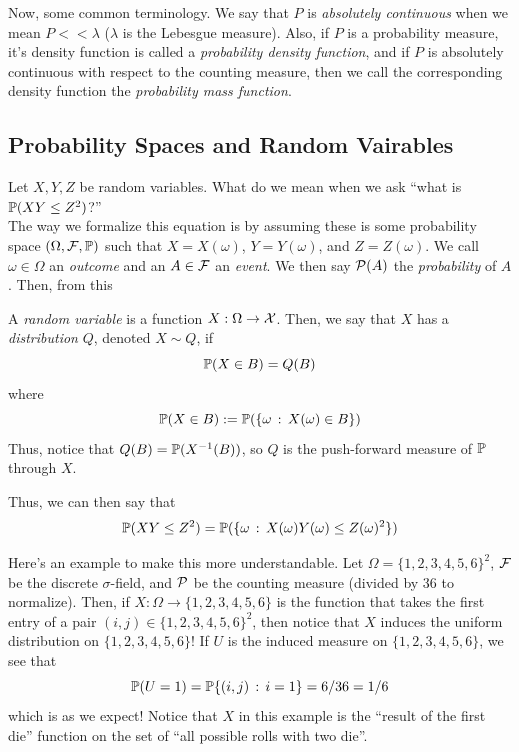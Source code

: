 Now, some common terminology. We say that $P$ is \emph{absolutely continuous} when we mean $P << \lambda$ ($\lambda$ is the Lebesgue measure). Also, if $P$ is a probability measure, it's density function is called a \emph{probability density function}, and if $P$ is absolutely continuous with respect to the counting measure, then we call the corresponding density function the \emph{probability mass function}.
\clearpage

\subsection*{Probability Spaces and Random Vairables}
Let $X, Y, Z$ be random variables. What do we mean when we ask ``what is $\bb{P}(XY \leq Z^2)$?''\\

The way we formalize this equation is by assuming these is some probability space $(\Omega, \cal{F}, \bb{P})$ such that $X = X(\omega)$, $Y = Y(\omega)$, and $Z = Z(\omega)$. We call $\omega \in \Omega$ an \emph{outcome} and an $A \in \cal{F}$ an \emph{event}. We then say $\cal{P}(A)$ the \emph{probability} of $A$. Then, from this
\begin{definition}
    A \emph{random variable} is a function $X : \Omega \to \cal{X}$. Then, we say that $X$ has a \emph{distribution} $Q$, denoted $X \sim Q$, if
    \[ \bb{P}(X \in B) = Q(B) \]
    where 
    \[ \bb{P}(X \in B) := \bb{P}(\{\omega \col X(\omega) \in B\}) \]
    Thus, notice that $Q(B) = \bb{P}(X^{-1}(B))$, so $Q$ is the push-forward measure of $\bb{P}$ through $X$.
\end{definition}

Thus, we can then say that
\[ \bb{P}(XY \leq Z^2) = \bb{P}(\{\omega \col X(\omega)Y(\omega) \leq Z(\omega)^2\}) \]

Here's an example to make this more understandable. Let $\Omega = \{1, 2, 3, 4, 5, 6\}^2$, $\cal{F}$ be the discrete $\sigma$-field, and $\cal{P}$ be the counting measure (divided by 36 to normalize). Then, if $X : \Omega \to \{1, 2, 3, 4, 5, 6\}$ is the function that takes the first entry of a pair $(i, j) \in \{1, 2, 3, 4, 5, 6\}^2$, then notice that $X$ induces the uniform distribution on $\{1, 2, 3, 4, 5, 6\}$! If $U$ is the induced measure on $\{1, 2, 3, 4, 5, 6\}$, we see that
\[ \bb{P}(U = 1) = \bb{P}\{(i, j) \col i = 1\} = 6/36 = 1/6 \]
which is as we expect! Notice that $X$ in this example is the ``result of the first die'' function on the set of ``all possible rolls with two die''.\\

